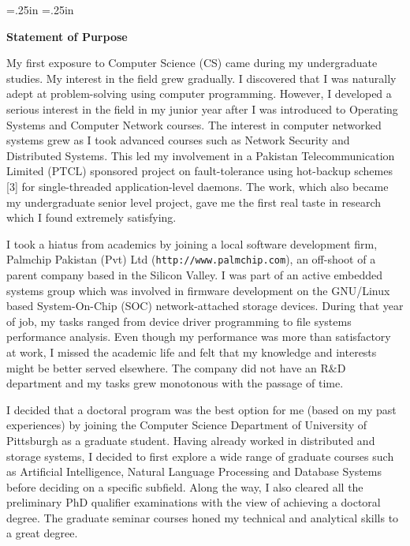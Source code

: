 
\oddsidemargin=.25in
\evensidemargin=.25in
\textwidth=6in
\topmargin=0in
\textheight=9in

\parindent=0in
\pagestyle{empty}





\centerline {\Large \bf Statement of Purpose}
\vs

My first exposure to Computer Science (CS) came during my undergraduate
studies. My interest in the field grew gradually. I discovered that I
was naturally adept at problem-solving using computer
programming. However, I developed a serious interest in the field in
my junior year after I was introduced to Operating Systems and
Computer Network courses. The interest in computer networked systems
grew as I took advanced courses such as Network Security and
Distributed Systems. This led my involvement in a Pakistan
Telecommunication Limited (PTCL) sponsored project on fault-tolerance
using hot-backup schemes [3] for single-threaded application-level
daemons. The work, which also became my undergraduate senior level
project, gave me the first real taste in research which I found
extremely satisfying.\vs

I took a hiatus from academics by joining a local software development
firm, Palmchip Pakistan (Pvt) Ltd (\verb|http://www.palmchip.com|), an
off-shoot of a parent company based in the Silicon Valley. I was
part of an active embedded systems group which was involved in
firmware development on the GNU/Linux based System-On-Chip (SOC)
network-attached storage devices. During that year of job, my
tasks ranged from device driver programming to file systems
performance analysis. Even though my performance was more than
satisfactory at work, I missed the academic life and felt that my
knowledge and interests might be better served elsewhere. The company
did not have an R$\&$D department and my tasks grew monotonous with the
passage of time.
\vs

I decided that a doctoral program was the best option for me (based on
my past experiences) by joining the Computer Science Department of
University of Pittsburgh as a graduate student. Having already worked
in distributed and storage systems, I decided to first explore a wide
range of graduate courses such as Artificial Intelligence, Natural
Language Processing and Database Systems before deciding on a specific
subfield. Along the way, I also cleared all the preliminary PhD
qualifier examinations with the view of achieving a doctoral
degree. The graduate seminar courses honed my technical and analytical
skills to a great degree. 
\vs

